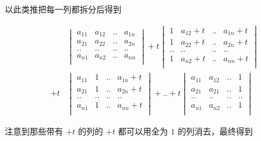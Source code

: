 \documentclass[12pt,a4paper]{ctexart}
\begin{document}
以此类推把每一列都拆分后得到

\begin{align*}
&\begin{vmatrix}
        a_{11}  & a_{12} & .. & a_{1n}  \\
        a_{21}  & a_{22}  & .. & a_{2n} \\
        .. & .. & .. & .. \\
        a_{n1} & a_{n2} & .. & a_{nn}  \\
\end{vmatrix} + t\begin{vmatrix}
        1  & a_{12} + t & .. & a_{1n} + t \\
        1  & a_{22} + t & .. & a_{2n} + t \\
        .. & .. & .. & .. \\
        1 & a_{n2} + t & .. & a_{nn} + t \\
    \end{vmatrix} \\ + t & \begin{vmatrix}
        a_{11}  & 1  & .. & a_{1n} + t \\
        a_{21}  & 1  & .. & a_{2n} + t \\
        .. & .. & .. & .. \\
        a_{n1} & 1 & .. & a_{nn} + t \\
    \end{vmatrix} + .. + t\begin{vmatrix}
        a_{11}  & a_{12}  & .. & 1 \\
        a_{21}  & a_{21}  & .. & 1 \\
        .. & .. & .. & .. \\
        a_{n1} & a_{n2} & .. & 1 \\
    \end{vmatrix}
\end{align*}

注意到那些带有 $+t$ 的列的 $+t$ 都可以用全为 $1$ 的列消去，最终得到
\end{document}
